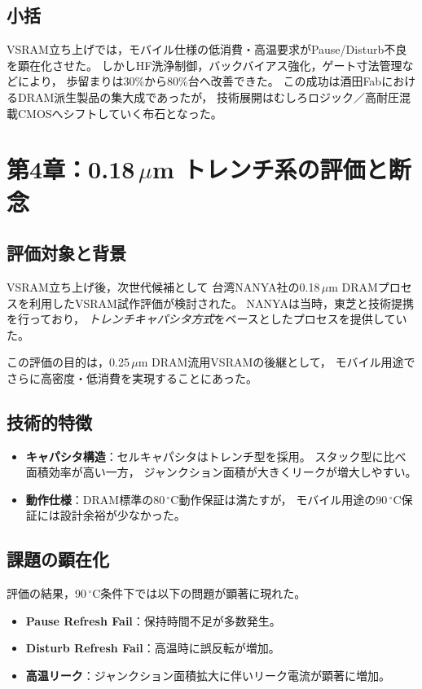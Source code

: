 \documentclass[conference]{IEEEtran}
\begin{document}
\subsection{小括}
VSRAM立ち上げでは，モバイル仕様の低消費・高温要求がPause/Disturb不良を顕在化させた。
しかしHF洗浄制御，バックバイアス強化，ゲート寸法管理などにより，
歩留まりは30\%から80\%台へ改善できた。
この成功は酒田FabにおけるDRAM派生製品の集大成であったが，
技術展開はむしろロジック／高耐圧混載CMOSへシフトしていく布石となった。

\section{第4章：0.18\,\texorpdfstring{$\mu$m}{μm} トレンチ系の評価と断念}

\subsection{評価対象と背景}
VSRAM立ち上げ後，次世代候補として
台湾NANYA社の0.18\,$\mu$m DRAMプロセスを利用したVSRAM試作評価が検討された。
NANYAは当時，東芝と技術提携を行っており，
\emph{トレンチキャパシタ方式}をベースとしたプロセスを提供していた。

この評価の目的は，0.25\,$\mu$m DRAM流用VSRAMの後継として，
モバイル用途でさらに高密度・低消費を実現することにあった。

\subsection{技術的特徴}
\begin{itemize}
  \item \textbf{キャパシタ構造}：セルキャパシタはトレンチ型を採用。
        スタック型に比べ面積効率が高い一方，
        ジャンクション面積が大きくリークが増大しやすい。
  \item \textbf{動作仕様}：DRAM標準の80\,$^\circ$C動作保証は満たすが，
        モバイル用途の90\,$^\circ$C保証には設計余裕が少なかった。
\end{itemize}

\subsection{課題の顕在化}
評価の結果，90\,$^\circ$C条件下では以下の問題が顕著に現れた。
\begin{itemize}
  \item \textbf{Pause Refresh Fail}：保持時間不足が多数発生。
  \item \textbf{Disturb Refresh Fail}：高温時に誤反転が増加。
  \item \textbf{高温リーク}：ジャンクション面積拡大に伴いリーク電流が顕著に増加。
\end{itemize}
\end{document}

